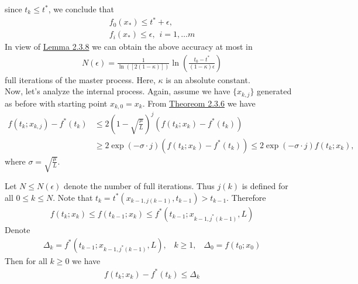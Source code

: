 \documentclass[12pt,a4paper]{article}
\begin{document}
	 since $t_k \leq t^*$, we conclude that
	 \begin{align*}
	 	f_0(x_*) \leq t^* + \epsilon, \\
	 	f_i(x_*) \leq \epsilon, \hspace{5pt} i=1, \ldots m
	 \end{align*}
	 In view of \hyperref[lem238]{Lemma 2.3.8} we can obtain the above accuracy at most in
	 \begin{align*}
	 	N(\epsilon) = \frac{1}{\ln([2(1 - \kappa)])}\ln(\frac{t_0 - t^*}{(1 - \kappa)\epsilon})
	 \end{align*}
	 full iterations of the master process. Here, $\kappa$ is an absolute constant. \\
	 Now, let's analyze the internal process. Again, assume we have $\{x_{k,j}\}$ generated as before with starting point $x_{k,0} = x_k$. From \hyperref[thm236]{Theoreom 2.3.6} we have
	 \begin{align*}
	 	f(t_k;x_{k,j}) - f^*(t_k) &\leq 2(1 - \sqrt{\frac{\mu}{L}})^j(f(t_k;x_k) - f^*(t_k)) \\
	 	&\geq 2\exp(-\sigma \cdot j)(f(t_k;x_k) - f^*(t_k)) \leq 2\exp(-\sigma \cdot j)f(t_k;x_k),
	 \end{align*}
	 where $\sigma = \sqrt{\frac{\mu}{L}}$.
	 
	 Let $N \leq N(\epsilon)$ denote the number of full iterations. Thus $j(k)$ is defined for all $0 \leq k \leq N$. Note that $t_k = t^*(x_{k-1,j(k-1)},t_{k-1}) > t_{k-1}$. Therefore
	 \begin{align*}
	 	f(t_k;x_k) \leq f(t_{k-1};x_k) \leq f^*(t_{k-1};x_{k-1,j^*(k-1)},L)
	 \end{align*}
	 Denote
	 \begin{align*}
	 	\Delta_k = f^*(t_{k-1};x_{k-1,j^*(k-1)},L), \hspace{10pt} k \geq 1, \hspace{10pt} \Delta_0 = f(t_0;x_0)
	 \end{align*}
	 Then for all $k \geq 0$ we have
	 \begin{align*}
	 	f(t_k;x_k) - f^*(t_k) \leq \Delta_k
	 \end{align*}
\end{document}
